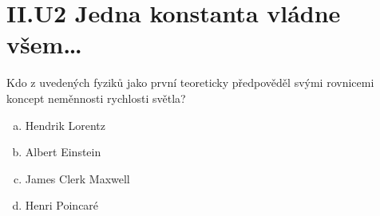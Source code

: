 \documentclass{../../../../style/mkimain}
\begin{document}
\section*{II.U2 Jedna konstanta vládne všem\dots}
\noindent Kdo z uvedených fyziků jako první teoreticky předpověděl svými rovnicemi koncept neměnnosti rychlosti světla?
\begin{enumerate}[a)]
    \item Hendrik Lorentz
    \item Albert Einstein
    \item James Clerk Maxwell
    \item Henri Poincaré
\end{enumerate}
\end{document}
